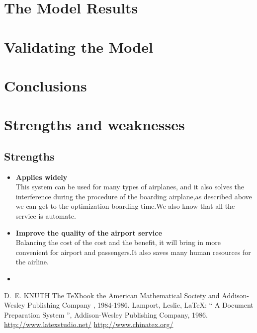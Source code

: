 \documentclass{mcmthesis}
\numberwithin{equation}{section}
\numberwithin{figure}{section}
\numberwithin{table}{section}
\begin{document}
\section{The Model Results}
\lipsum[6]

\section{Validating the Model}
\lipsum[9]

\section{Conclusions}
\lipsum[6]


\section{Strengths and weaknesses}
\lipsum[12]

\subsection{Strengths}
\begin{itemize}
\item \textbf{Applies widely}\\
This  system can be used for many types of airplanes, and it also
solves the interference during  the procedure of the boarding
airplane,as described above we can get to the  optimization
boarding time.We also know that all the service is automate.
\item \textbf{Improve the quality of the airport service}\\
Balancing the cost of the cost and the benefit, it will bring in
more convenient  for airport and passengers.It also saves many
human resources for the airline. \item \textbf{}
\end{itemize}

\begin{thebibliography}{99}
 D.~E. KNUTH   The \TeX{}book  the American
Mathematical Society and Addison-Wesley
Publishing Company , 1984-1986.
Lamport, Leslie,  \LaTeX{}: `` A Document Preparation System '',
Addison-Wesley Publishing Company, 1986.
\url{http://www.latexstudio.net/}
\url{http://www.chinatex.org/}
\end{thebibliography}
\end{document}
